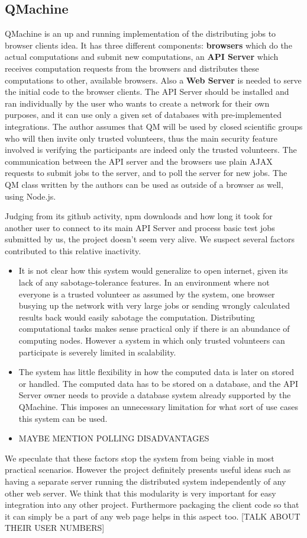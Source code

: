 \subsection{QMachine \cite{wilkinson2014qmachine}}
QMachine is an up and running implementation of the distributing jobs to browser clients idea. It has three different components: \textbf{browsers} which do the actual computations and submit new computations, an \textbf{API Server} which receives computation requests from the browsers and distributes these computations to other, available browsers. Also a \textbf{Web Server} is needed to serve the initial code to the browser clients. The API Server should be installed and ran individually by the user who wants to create a network for their own purposes, and it can use only a given set of databases with pre-implemented integrations. The author assumes that QM will be used by closed scientific groups who will then invite only trusted volunteers, thus the main security feature involved is verifying the participants are indeed only the trusted volunteers. The communication between the API server and the browsers use plain AJAX requests to submit jobs to the server, and to poll the server for new jobs. The QM class written by the authors can be used as outside of a browser as well, using Node.js.

Judging from its github activity, npm downloads and how long it took for another user to connect to its main API Server and process basic test jobs submitted by us, the project doesn't seem very alive. We suspect several factors contributed to this relative inactivity. 
\begin{itemize}
	\item It is not clear how this system would generalize to open internet, given its lack of any sabotage-tolerance features. In an environment where not everyone is a trusted volunteer as assumed by the system, one browser busying up the network with very large jobs or sending wrongly calculated results back would easily sabotage the computation. Distributing computational tasks makes sense practical only if there is an abundance of computing nodes. However a system in which only trusted volunteers can participate is severely limited in scalability.
	\item The system has little flexibility in how the computed data is later on stored or handled. The computed data has to be stored on a database, and the API Server owner needs to provide a database system already supported by the QMachine. This imposes an unnecessary limitation for what sort of use cases this system can be used.
	\item MAYBE MENTION POLLING DISADVANTAGES
\end{itemize}
We speculate that these factors stop the system from being viable in most practical scenarios. However the project definitely presents useful ideas such as having a separate server running the distributed system independently of any other web server. We think that this modularity is very important for easy integration into any other project. Furthermore packaging the client code so that it can simply be a part of any web page helps in this aspect too.
[TALK ABOUT THEIR USER NUMBERS]


